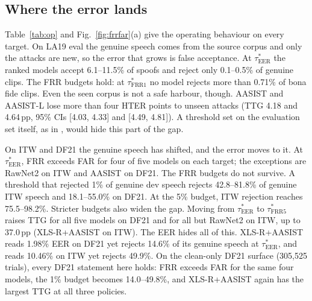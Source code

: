 \documentclass[conference]{IEEEtran}
\newcommand{\tauE}{\tau^{*}_{\mathrm{EER}}}
\newcommand{\tauF}[1]{\tau^{*}_{\mathrm{FRR}#1}}
\begin{document}
\subsection{Where the error lands}
Table~\ref{tab:op} and Fig.~\ref{fig:frrfar}(a) give the operating behaviour on
every target. On LA19 eval the genuine speech comes from the source corpus and
only the attacks are new, so the error that grows is false acceptance. At
\(\tauE\) the ranked models accept 6.1--11.5\% of spoofs and reject only
0.1--0.5\% of genuine clips. The FRR budgets hold: at \(\tauF{1}\)
no model rejects more than 0.71\% of bona fide clips. Even the seen corpus is not
a safe harbour, though. AASIST and AASIST-L lose more than four HTER points to
unseen attacks (TTG 4.18 and 4.64\,pp, 95\% CIs [4.03, 4.33] and [4.49, 4.81]).
A threshold set on the evaluation set itself, as in \cite{zhou26_eer_hides},
would hide this part of the gap.

On ITW and DF21 the genuine speech has shifted, and the error moves to it. At
\(\tauE\), FRR exceeds FAR for four of five models on each target; the
exceptions are RawNet2 on ITW and AASIST on DF21. The FRR budgets do not
survive. A threshold that rejected 1\% of genuine dev speech rejects
42.8--81.8\% of genuine ITW speech and 18.1--55.0\% on DF21. At the 5\% budget,
ITW rejection reaches 75.5--98.2\%. Stricter budgets also widen the gap. Moving
from \(\tauE\) to \(\tauF{5}\) raises TTG for all five models on DF21 and for
all but RawNet2 on ITW, up to 37.0\,pp (XLS-R+AASIST on ITW).
The EER hides all of this. XLS-R+AASIST
reads 1.98\% EER on DF21 yet rejects 14.6\% of its genuine speech at \(\tauE\),
and reads 10.46\% on ITW yet rejects 49.9\%. On the clean-only DF21 surface
(305,525 trials), every DF21 statement here holds: FRR exceeds FAR for the same
four models, the 1\% budget becomes 14.0--49.8\%, and XLS-R+AASIST again has
the largest TTG at all three policies.
\end{document}
